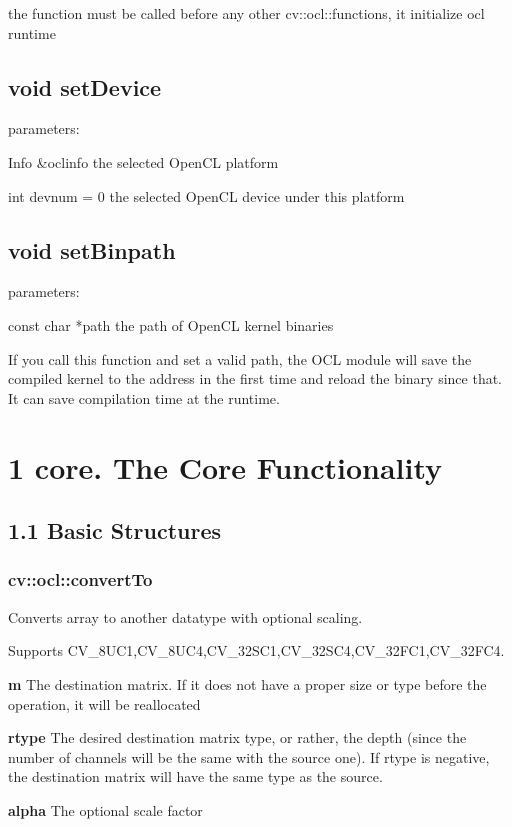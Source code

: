\documentclass{article}
\begin{document}
the function must be called before any other cv::ocl::functions, it initialize ocl runtime

\subsection{void setDevice}


parameters:

Info \&oclinfo  the selected OpenCL platform

int devnum = 0 the selected OpenCL device under this platform

\subsection{void setBinpath}


parameters:

const char *path the path of OpenCL kernel binaries

If you call this function and set a valid path, the OCL module will save the compiled kernel to the address in the first time and reload the binary since that. It can save compilation time at the runtime.


\section{1 core. The Core Functionality}
\label{sec:mylabel1}
\subsection{1.1 Basic Structures}
\label{subsec:mylabel1}
\subsubsection{cv::ocl::convertTo}
\label{subsubsec:mylabel1}
Converts array to another datatype with optional scaling.

Supports CV{\_}8UC1,CV{\_}8UC4,CV{\_}32SC1,CV{\_}32SC4,CV{\_}32FC1,CV{\_}32FC4.

\textbf{m }The destination matrix. If it does not have a proper size or type
before the operation, it will be reallocated

\textbf{rtype }The desired destination matrix type, or rather, the depth
(since the number of channels will be the same with the source one). If
rtype is negative, the destination matrix will have the same type as the
source.

\textbf{alpha }The optional scale factor
\end{document}
